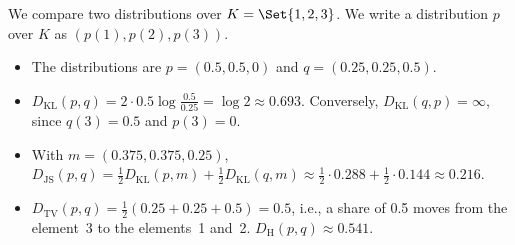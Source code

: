 \begin{example}
	\label{ex:prelim:divergences}
	We compare two distributions over $K = \Set{1, 2, 3}$. We write a distribution $p$ over $K$ as $(p(1), p(2), p(3))$.
	\begin{itemize}
		\item The distributions are $p = (0.5, 0.5, 0)$ and $q = (0.25, 0.25, 0.5)$.

		\item $D_{\mathrm{KL}}(p, q) = 2 \cdot 0.5 \log \frac{0.5}{0.25} = \log 2 \approx 0.693$. Conversely, $D_{\mathrm{KL}}(q, p) = \infty$, since $q(3) = 0.5$ and $p(3) = 0$.

		\item With $m = (0.375, 0.375, 0.25)$, $D_{\mathrm{JS}}(p, q) = \frac{1}{2} D_{\mathrm{KL}}(p, m) + \frac{1}{2} D_{\mathrm{KL}}(q, m) \approx \frac{1}{2} \cdot 0.288 + \frac{1}{2} \cdot 0.144 \approx 0.216$.

		\item $D_{\mathrm{TV}}(p, q) = \frac{1}{2} (0.25 + 0.25 + 0.5) = 0.5$, i.e., a share of 0.5 moves from the element~3 to the elements~1 and~2. $D_{\mathrm{H}}(p, q) \approx 0.541$.
	\end{itemize}
\end{example}

